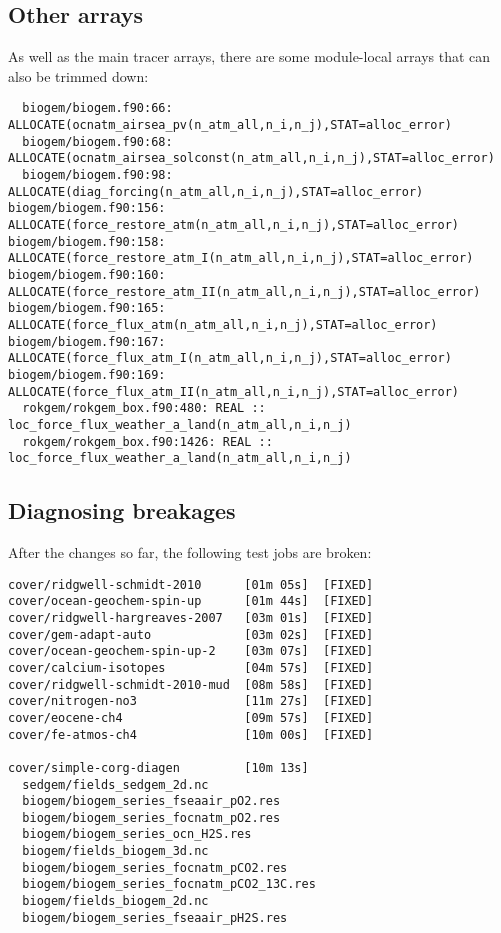 \documentclass[a4paper,10pt,article]{memoir}
\begin{document}
\subsection{Other arrays}

As well as the main tracer arrays, there are some module-local arrays
that can also be trimmed down:
\begin{verbatim}
  biogem/biogem.f90:66: ALLOCATE(ocnatm_airsea_pv(n_atm_all,n_i,n_j),STAT=alloc_error)
  biogem/biogem.f90:68: ALLOCATE(ocnatm_airsea_solconst(n_atm_all,n_i,n_j),STAT=alloc_error)
  biogem/biogem.f90:98: ALLOCATE(diag_forcing(n_atm_all,n_i,n_j),STAT=alloc_error)
biogem/biogem.f90:156: ALLOCATE(force_restore_atm(n_atm_all,n_i,n_j),STAT=alloc_error)
biogem/biogem.f90:158: ALLOCATE(force_restore_atm_I(n_atm_all,n_i,n_j),STAT=alloc_error)
biogem/biogem.f90:160: ALLOCATE(force_restore_atm_II(n_atm_all,n_i,n_j),STAT=alloc_error)
biogem/biogem.f90:165: ALLOCATE(force_flux_atm(n_atm_all,n_i,n_j),STAT=alloc_error)
biogem/biogem.f90:167: ALLOCATE(force_flux_atm_I(n_atm_all,n_i,n_j),STAT=alloc_error)
biogem/biogem.f90:169: ALLOCATE(force_flux_atm_II(n_atm_all,n_i,n_j),STAT=alloc_error)
  rokgem/rokgem_box.f90:480: REAL :: loc_force_flux_weather_a_land(n_atm_all,n_i,n_j)
  rokgem/rokgem_box.f90:1426: REAL :: loc_force_flux_weather_a_land(n_atm_all,n_i,n_j)
\end{verbatim}

\subsection{Diagnosing breakages}

After the changes so far, the following test jobs are broken:

\begin{verbatim}
cover/ridgwell-schmidt-2010      [01m 05s]  [FIXED]
cover/ocean-geochem-spin-up      [01m 44s]  [FIXED]
cover/ridgwell-hargreaves-2007   [03m 01s]  [FIXED]
cover/gem-adapt-auto             [03m 02s]  [FIXED]
cover/ocean-geochem-spin-up-2    [03m 07s]  [FIXED]
cover/calcium-isotopes           [04m 57s]  [FIXED]
cover/ridgwell-schmidt-2010-mud  [08m 58s]  [FIXED]
cover/nitrogen-no3               [11m 27s]  [FIXED]
cover/eocene-ch4                 [09m 57s]  [FIXED]
cover/fe-atmos-ch4               [10m 00s]  [FIXED]

cover/simple-corg-diagen         [10m 13s]
  sedgem/fields_sedgem_2d.nc
  biogem/biogem_series_fseaair_pO2.res
  biogem/biogem_series_focnatm_pO2.res
  biogem/biogem_series_ocn_H2S.res
  biogem/fields_biogem_3d.nc
  biogem/biogem_series_focnatm_pCO2.res
  biogem/biogem_series_focnatm_pCO2_13C.res
  biogem/fields_biogem_2d.nc
  biogem/biogem_series_fseaair_pH2S.res
\end{verbatim}
\end{document}
